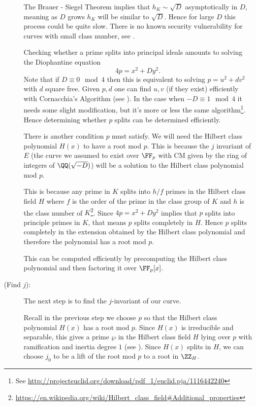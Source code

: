 \documentclass[11pt]{article}
\begin{document}
\begin{description}
	\begin{rem}
		The Brauer - Siegel Theorem implies that $h_K \sim \sqrt{D}$ asymptotically in $D$, meaning as $D$ grows $h_K$ will be similar to $\sqrt{D}$. Hence for large $D$ this process could be quite slow. There is no known security vulnerability for curves with small class number, see \cite[Ch.~4.2.3, Pg.~179]{hankerson2004guide}.
	\end{rem}

	Checking whether a prime splits into principal ideals amounts to solving the Diophantine equation
	$$
	4p = x^2 + Dy^2.
	$$
	Note that if $D\equiv 0\mod{4}$ then this is equivalent to solving $p = u^2 + dv^2$ with $d$ square free. Given $p,d$ one can find $u,v$ (if they exist) efficiently with Cornacchia's Algorithm (see \cite[Alg.~VIII.1]{blake1999elliptic}). In the case when $-D\equiv 1\mod{4}$ it needs some slight modification, but it's more or less the same algorithm\footnote{See \url{http://projecteuclid.org/download/pdf_1/euclid.pja/1116442240}}. Hence determining whether $p$ splits can be determined efficiently.
	
	There is another condition $p$ must satisfy. We will need the Hilbert class polynomial $H(x)$ to have a root mod $p$. This is because the $j$ invariant of $E$ (the curve we assumed to exist over $\FF_p$ with CM given by the ring of integers of $\QQ(\sqrt{-D})$) will be a solution to the Hilbert class polynomial mod $p$.
	
	
	This is because any prime in $K$ splits into $h/f$ primes in the Hilbert class field $H$ where $f$ is the order of the prime in the class group of $K$ and $h$ is the class number of $K$\footnote{\url{https://en.wikipedia.org/wiki/Hilbert\_class\_field\#Additional\_properties}}. Since $4p = x^2 + Dy^2$ implies that $p$ splits into principle primes in $K$, that means $p$ splits completely in $H$. Hence $p$ splits completely in the extension obtained by the Hilbert class polynomial and therefore the polynomial has a root mod $p$.
	  
	This can be computed efficiently by precomputing the Hilbert class polynomial and then factoring it over $\FF_p[x]$.
	
	\item[(Find $j$):]
	
	The next step is to find the $j$-invariant of our curve.
	
	Recall in the previous step we choose $p$ so that the Hilbert class polynomial $H(x)$ has a root mod $p$. Since $H(x)$ is irreducible and separable, this gives a prime $\wp$ in the Hilbert class field $H$ lying over $p$ with ramification and inertia degree $1$ (see \cite[Prop.~I.8.3]{neukirch2013algebraic}). Since $H(x)$ splits in $H$, we can choose $j_0$ to be a lift of the root mod $p$ to a root in $\ZZ_H$.
	

\end{description}
\end{document}
